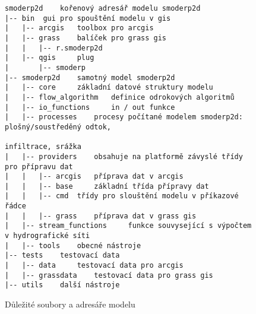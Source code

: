 

\begin{figure}[t!]
  \centering
    \begin{verbatim}
smoderp2d 	 kořenový adresář modelu smoderp2d
|-- bin	 gui pro spouštění modelu v gis
|   |-- arcgis	 toolbox pro arcgis
|   |-- grass	 balíček pro grass gis
|   |   |-- r.smoderp2d
|   |-- qgis	 plug
|       |-- smoderp
|-- smoderp2d	 samotný model smoderp2d
|   |-- core	 základní datové struktury modelu
|   |-- flow_algorithm	 definice odrokových algoritmů
|   |-- io_functions	 in / out funkce
|   |-- processes	 procesy počítané modelem smoderp2d: plošný/soustředěný odtok, 
                                                       infiltrace, srážka
|   |-- providers	 obsahuje na platformě závyslé třídy pro přípravu dat
|   |   |-- arcgis	 příprava dat v arcgis
|   |   |-- base	 základní třída přípravy dat
|   |   |-- cmd	 třídy pro slouštění modelu v příkazové řádce
|   |   |-- grass	 příprava dat v grass gis
|   |-- stream_functions	 funkce souvysející s výpočtem v hydrografické síti
|   |-- tools	 obecné nástroje
|-- tests	 testovací data
|   |-- data	 testovací data pro arcgis
|   |-- grassdata	 testovací data pro grass gis
|-- utils	 další nástroje
\end{verbatim}
  \caption{Důležité soubory a adresáře modelu \smod}
  \label{fig:adresare}
\end{figure}



